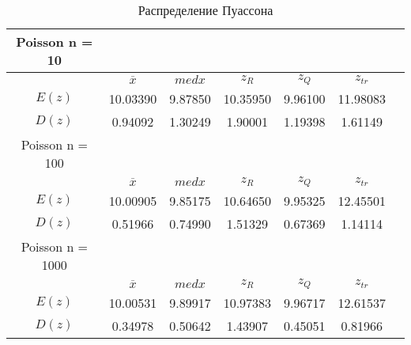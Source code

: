 \documentclass[12pt,a4paper]{scrartcl}
\begin{document}
\begin{table}[H]
  \centering
  \begin{tabular}{ | c | c | c | c | c | c | c | }
	\hline
Poisson n = 10 & & & & &  \\ \hline
         & $\overline x$& $med x$& $z_R $ & $z_Q $  &  $z_{tr}$  \\ \hline
         $E(z)$ & 10.03390 & 9.87850 & 10.35950 & 9.96100 & 11.98083 \\ \hline
         $D(z)$ & 0.94092 & 1.30249 & 1.90001 & 1.19398 & 1.61149 \\ \hline

Poisson n = 100 & & & & &  \\ \hline
         & $\overline x$& $med x$& $z_R $ & $z_Q $  &  $z_{tr}$  \\ \hline
         $E(z)$ & 10.00905 & 9.85175 & 10.64650 & 9.95325 & 12.45501 \\ \hline
         $D(z)$ & 0.51966 & 0.74990 & 1.51329 & 0.67369 & 1.14114 \\ \hline

Poisson n = 1000 & & & & &  \\ \hline
         & $\overline x$& $med x$& $z_R $ & $z_Q $  &  $z_{tr}$  \\ \hline
         $E(z)$ & 10.00531 & 9.89917 & 10.97383 & 9.96717 & 12.61537 \\ \hline
         $D(z)$ & 0.34978 & 0.50642 & 1.43907 & 0.45051 & 0.81966 \\ \hline
	\end{tabular}
  \label{table:poisson_table}
\caption{Распределение Пуассона}
\end{table}
\end{document}
